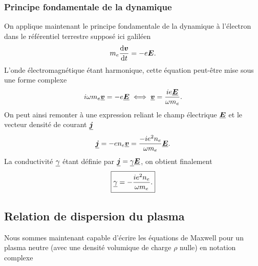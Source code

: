 \subsubsection{Principe fondamentale de la dynamique}
On applique maintenant le principe fondamentale de la dynamique à l'électron dans
le référentiel terrestre supposé ici galiléen
\begin{equation*}
	m_e \dn{\vecv}{t} = -e \vece.
\end{equation*}
L'onde électromagnétique étant harmonique, cette équation peut-être mise sous 
une forme complexe
\begin{equation*}
	i \omega m_e \complex{\vecv} = -e \complex{\vece}
	\iff 
	\complex{\vecv} = \dfrac{i e \complex{\vece}}{\omega m_e}.
\end{equation*}
On peut ainsi remonter à une expression reliant le champ électrique 
$\complex{\vece}$ et le vecteur densité de courant $\complex{\vecj}$
\begin{equation*}
	\complex{\vecj} = -e n_e \complex{\vecv} = \dfrac{-i e^2 n_e}{\omega m_e}
	\complex{\vece}.
\end{equation*}
La conductivité $\underline{\gamma}$ étant définie par $\complex{\vecj} =
\complex{\gamma} \complex{\vece}$, on obtient finalement
\begin{equation*}
	\boxed{
	\underline{\gamma} = - \dfrac{i e^2 n_e}{\omega m_e}.
}
\end{equation*}

\subsection{Relation de dispersion du plasma}
Nous sommes maintenant capable d'écrire les équations de Maxwell pour un plasma neutre
(avec une densité volumique de charge $\rho$ nulle) en notation complexe


